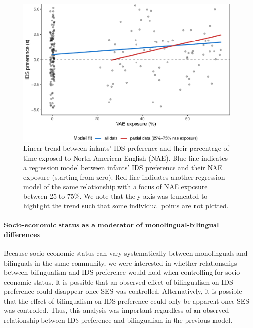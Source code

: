 \documentclass[
  english,
  ,man,floatsintext]{apa6}
\let\oldparagraph\paragraph
\renewcommand{\paragraph}[1]{\oldparagraph{#1}\mbox{}}
\begin{document}
\begin{figure}
\centering
\includegraphics{mb1b-paper_files/figure-latex/fig2-1.pdf}
\caption{\label{fig:fig2}Linear trend between infants' IDS preference and their percentage of time exposed to North American English (NAE). Blue line indicates a regression model between infants' IDS preference and their NAE exposure (starting from zero). Red line indicates another regression model of the same relationship with a focus of NAE exposure between 25 to 75\%. We note that the y-axis was truncated to highlight the trend such that some individual points are not plotted.}
\end{figure}

\hypertarget{socio-economic-status-as-a-moderator-of-monolingual-bilingual-differences}{%
\paragraph{Socio-economic status as a moderator of monolingual-bilingual differences}\label{socio-economic-status-as-a-moderator-of-monolingual-bilingual-differences}}

Because socio-economic status can vary systematically between monolinguals and bilinguals in the same community, we were interested in whether relationships between bilingualism and IDS preference would hold when controlling for socio-economic status. It is possible that an observed effect of bilingualism on IDS preference could disappear once SES was controlled. Alternatively, it is possible that the effect of bilingualism on IDS preference could only be apparent once SES was controlled. Thus, this analysis was important regardless of an observed relationship between IDS preference and bilingualism in the previous model.
\end{document}
